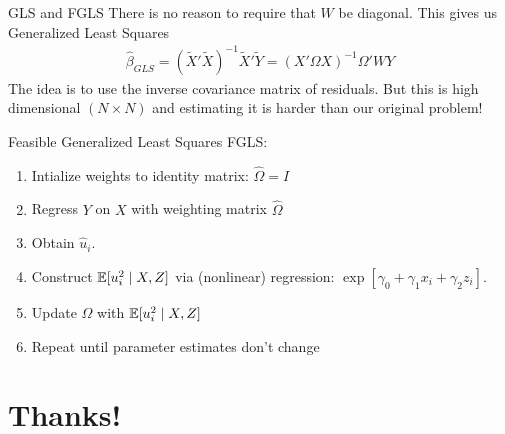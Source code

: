 \begin{frame}{GLS and FGLS}
There is no reason to require that $W$ be diagonal. This gives us \alert{Generalized Least Squares}
\begin{align*}
\widehat{\beta}_{GLS} = (\tilde{X}'\tilde{X})^{-1}\tilde{X}'\tilde{Y} = (X' \Omega  X)^{-1} \Omega' W Y
\end{align*}
The idea is to use the \alert{inverse covariance matrix} of residuals. But this is high dimensional $(N \times N)$ and estimating it is harder than our original problem!

 Feasible Generalized Least Squares \alert{FGLS}:
\begin{enumerate}
\item Intialize weights to identity matrix: $\widehat{\Omega}= I$
\item Regress $Y$ on $X$ with weighting matrix $\widehat{\Omega}$
\item Obtain $\widehat{u}_i$.
\item Construct $\mathbb{E}[ u_i^2 \mid X, Z]$ via (nonlinear) regression: $\exp[ \gamma_0 + \gamma_1 x_{i} + \gamma_2 z_{i}]$.
\item Update $\widehat{\Omega}$ with $\mathbb{E}[ u_i^2 \mid X, Z]$
\item Repeat until parameter estimates don't change
\end{enumerate}
\end{frame}


\section*{Thanks!}

